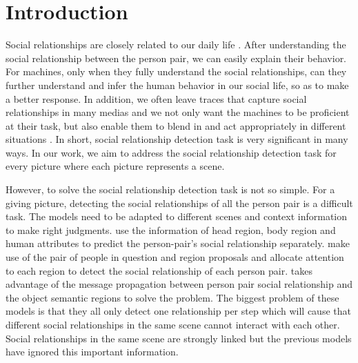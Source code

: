 \documentclass{article}
\begin{document}
\section{Introduction}
Social relationships are closely related to our daily life \cite{DBLP:conf/wacv/BarrCBF14}. After understanding the social relationship between the person pair, we can easily explain their behavior. For machines, only when they fully understand the social relationships, can they further understand and infer the human behavior in our social life, so as to make a better response. In addition, we often leave traces that capture social relationships in many medias and we not only want the machines to be proficient at their task, but also enable them to blend in and
act appropriately in different situations \cite{DBLP:conf/cvpr/SunSF17}. In short, social relationship detection task is very significant in many ways. In our work, we aim to address the social relationship detection task for every picture where each picture represents a scene. 

However, to solve the social relationship detection task is not so simple. For a giving picture, detecting the social relationships of all the person pair is a difficult task. The models need to be adapted to different scenes and context information to make right judgments.  \cite{DBLP:conf/cvpr/SunSF17} use the information of head region, body region and human attributes to predict the person-pair's social relationship separately. \cite{DBLP:conf/iccv/LiWZK17} make use of the pair of people in question and region proposals and allocate attention to each region to detect the social relationship of each person pair. \cite{DBLP:conf/ijcai/WangCRYCL18} takes advantage of the message propagation between person pair social relationship and the object  semantic regions to solve the problem. The biggest problem of these models is that they all only detect one relationship per step which will cause that different social relationships in the same scene cannot interact with each other. Social relationships in the same scene are strongly linked but the previous models have ignored this important information.
\end{document}

